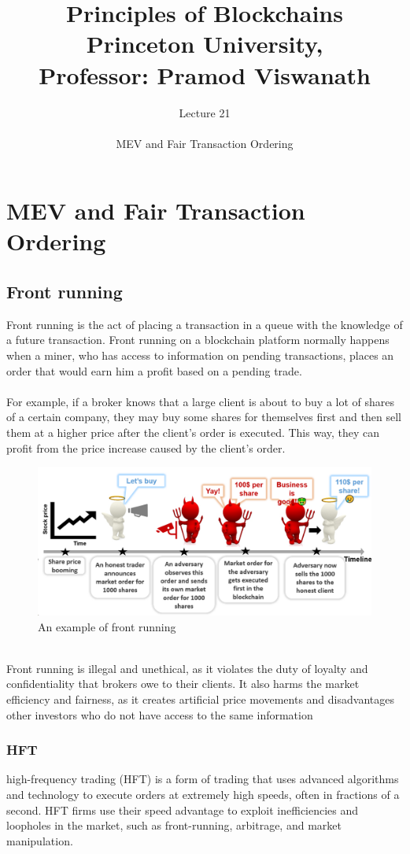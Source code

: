 \documentclass{report}
\title{\Huge{Principles of Blockchains \\ Princeton University,\\
		Professor: Pramod Viswanath}}
\author{\huge{Lecture 21} \\\\ MEV and Fair Transaction Ordering}
\begin{document}
\maketitle
\newpage%
\tableofcontents
\pagebreak

\chapter{MEV and Fair Transaction Ordering}

\section{Front running}
Front running is the act of placing a transaction in a queue with the knowledge of a future transaction. Front running on a blockchain platform normally happens when a miner, who has access to information on pending transactions, places an order that would earn him a profit based on a pending trade.\\\\
For example, if a broker knows that a large client is about to buy a lot of shares of a certain company, they may buy some shares for themselves first and then sell them at a higher price after the client’s order is executed. This way, they can profit from the price increase caused by the client’s order.
\begin{figure}[h!]
	\centering
	\includegraphics[width=0.7\linewidth]{Fig/F1}
	\caption{An example of front running}
	\label{fig:f1}
\end{figure}\\	
Front running is illegal and unethical, as it violates the duty of loyalty and confidentiality that brokers owe to their clients. It also harms the market efficiency and fairness, as it creates artificial price movements and disadvantages other investors who do not have access to the same information

\subsection{HFT}
high-frequency trading (HFT) is a form of trading that uses advanced algorithms and technology to execute orders at extremely high speeds, often in fractions of a second. HFT firms use their speed advantage to exploit inefficiencies and loopholes in the market, such as front-running, arbitrage, and market manipulation. 
\end{document}
